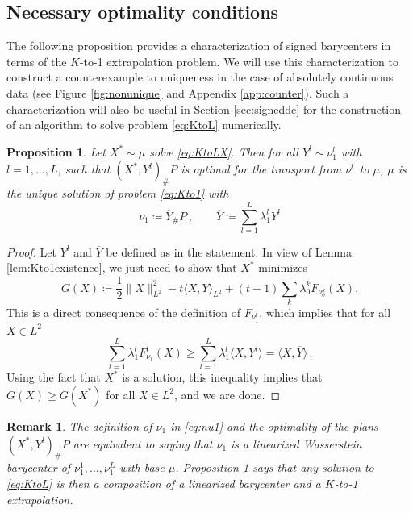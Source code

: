 \documentclass[12pt]{amsart}
\numberwithin{equation}{section}
\theoremstyle{plain}
\newtheorem{remark}[theorem]{Remark}
\newtheorem{proposition}[theorem]{Proposition}
\theoremstyle{definition}
\begin{document}
\subsection{Necessary optimality conditions} The following proposition provides a characterization of signed barycenters in terms of the $K$-to-1 extrapolation problem. We will use this characterization to construct a counterexample to uniqueness in the case of absolutely continuous data (see Figure \ref{fig:nonunique} and Appendix \ref{app:counter}). Such a  characterization will also be useful in Section \ref{sec:signeddc} for the construction of an algorithm to solve problem \eqref{eq:KtoL} numerically. 

\begin{proposition}\label{prop:crit} Let $X^* \sim \mu$ solve \eqref{eq:KtoLX}. Then for all $Y^l \sim \nu_1^l$ with $l=1,\ldots,L$, such that $(X^*,Y^l)_\# P$ is optimal for the transport from $\nu_1^l$ to $\mu$, $\mu$ is the unique solution of problem \eqref{eq:Kto1} with 
\begin{equation}\label{eq:nu1}
\nu_1 \coloneqq \overline{Y}_\# P\,, \qquad \overline{Y} \coloneqq \sum_{l=1}^L \lambda_1^l Y^l
\end{equation}
\end{proposition}
\begin{proof} Let $Y^l$ and $\overline{Y}$ be defined as in the statement. In view of Lemma \ref{lem:Kto1existence}, we just need to show that $X^*$  minimizes
\[
G(X) \coloneqq \frac{1}{2} \|X\|^2_{L^2} -t \langle X, \overline{Y}\rangle_{L^2}  + (t-1) \sum_{k}\lambda_0^k F_{\nu_0^k}(X).
\]
This is a direct consequence of the definition of $F_{\nu_1^l}$, which implies that for all $X \in L^2$
\[
 \sum_{l=1}^L \lambda_1^l F_{\nu_1}^l(X) \geq  \sum_{l=1}^L \lambda_1^l \langle X, {Y}^l\rangle   = \langle X,\overline{Y}\rangle \,.
\]
Using the fact that $X^*$ is a solution, this inequality implies that $G(X) \geq G(X^*)$ for all $X\in L^2$, and we are done.

\end{proof}

\begin{remark} The definition of $\nu_1$ in \eqref{eq:nu1} and the optimality of the plans $(X^*,Y^l)_\# P$ are equivalent to saying that $\nu_1$ is a linearized Wasserstein barycenter of $\nu_1^1, \ldots, \nu_1^L$ with base $\mu$. Proposition \ref{prop:crit} says that any solution to \eqref{eq:KtoL} is then a composition of a linearized barycenter and a $K$-to-1 extrapolation.
\end{remark}
\end{document}
